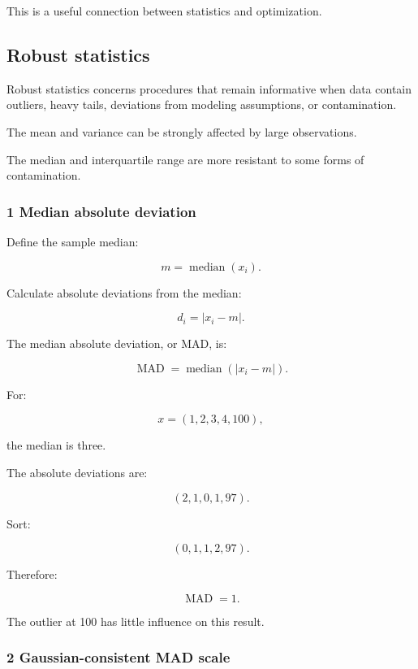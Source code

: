 This is a useful connection between statistics and optimization.

\subsection{Robust statistics}\label{02-foundations-ii-ch030-robust-statistics}

\hypertarget{02-foundations-ii-ch030-robust-statistics}{}

Robust statistics concerns procedures that remain informative when data contain outliers, heavy tails, deviations from modeling assumptions, or contamination.

The mean and variance can be strongly affected by large observations.

The median and interquartile range are more resistant to some forms of contamination.

\subsubsection{1 Median absolute deviation}\label{02-foundations-ii-ch030-median-absolute-deviation}

\hypertarget{02-foundations-ii-ch030-median-absolute-deviation}{}

Define the sample median:

\[
 m=\operatorname{median}(x_i).
\]

Calculate absolute deviations from the median:

\[
 d_i=|x_i-m|.
\]

The median absolute deviation, or MAD, is:

\[
 \boxed{ \operatorname{MAD} = \operatorname{median}(|x_i-m|) }.
\]

For:

\[
 x=(1,2,3,4,100),
\]

the median is three.

The absolute deviations are:

\[
 (2,1,0,1,97).
\]

Sort:

\[
 (0,1,1,2,97).
\]

Therefore:

\[
 \boxed{\operatorname{MAD}=1}.
\]

The outlier at 100 has little influence on this result.

\subsubsection{2 Gaussian-consistent MAD scale}\label{02-foundations-ii-ch030-gaussian-consistent-mad-scale}

